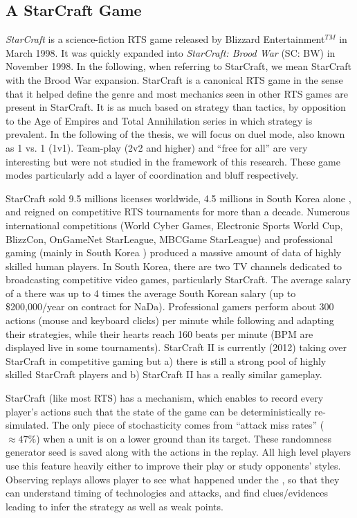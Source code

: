 \subsection{A StarCraft Game}
\textit{StarCraft} is a science-fiction RTS game released by Blizzard Entertainment$^{TM}$ in March 1998. It was quickly expanded into \textit{StarCraft: Brood War} (SC: BW) in November 1998. In the following, when referring to StarCraft, we mean StarCraft with the Brood War expansion. StarCraft is a canonical RTS game in the sense that it helped define the genre and most  mechanics seen in other RTS games are present in StarCraft. It is as much based on strategy than tactics, by opposition to the Age of Empires and Total Annihilation series in which strategy is prevalent. In the following of the thesis, we will focus on duel mode, also known as 1 vs. 1 (1v1). Team-play (2v2 and higher) and ``free for all'' are very interesting but were not studied in the framework of this research. These game modes particularly add a layer of coordination and bluff respectively.


StarCraft sold 9.5 millions licenses worldwide, 4.5 millions in South Korea alone \citep{StarCraftNumbers}, and reigned on competitive RTS tournaments for more than a decade. Numerous international competitions (World Cyber Games, Electronic Sports World Cup, BlizzCon, OnGameNet StarLeague, MBCGame StarLeague) and professional gaming (mainly in South Korea \citep{Chee05}) produced a massive amount of data of highly skilled human players. In South Korea, there are two TV channels dedicated to broadcasting competitive video games, particularly StarCraft. The average salary of a  there was up to 4 times the average South Korean salary \citep{MYMPGM} (up to \$200,000/year on contract for NaDa). Professional gamers perform about 300 actions (mouse and keyboard clicks) per minute while following and adapting their strategies, while their hearts reach 160 beats per minute (BPM are displayed live in some tournaments). StarCraft II is currently (2012) taking over StarCraft in competitive gaming but a) there is still a strong pool of highly skilled StarCraft players and b) StarCraft II has a really similar gameplay.


StarCraft (like most RTS) has a \textit{} mechanism, which enables to record every player's actions such that the state of the game can be deterministically re-simulated. The only piece of stochasticity comes from ``attack miss rates'' ($\approx 47\%$) when a unit is on a lower ground than its target. These randomness generator seed is saved along with the actions in the replay. All high level players use this feature heavily either to improve their play or study opponents' styles. Observing replays allows player to see what happened under the \textit{}, so that they can understand timing of technologies and attacks, and find clues/evidences leading to infer the strategy as well as weak points.


